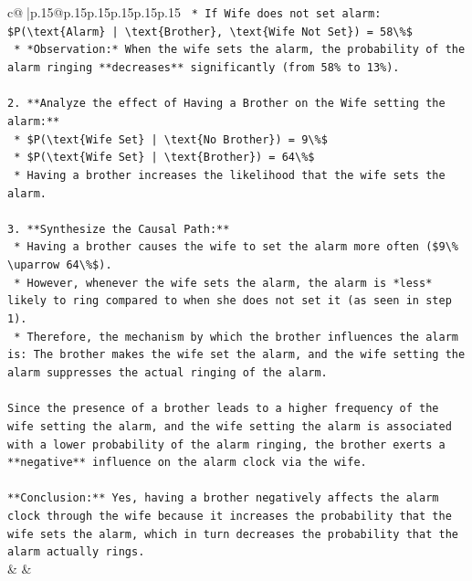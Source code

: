 \documentclass{article}
\begin{document}
{\begin{supertabular}{c@{$\;$}|p{.15\linewidth}@{}p{.15\linewidth}p{.15\linewidth}p{.15\linewidth}p{.15\linewidth}p{.15\linewidth}}
{{{\texttt{        *   If Wife does not set alarm: \$P(\textbackslash{}text\{Alarm\} | \textbackslash{}text\{Brother\}, \textbackslash{}text\{Wife Not Set\}) = 58\textbackslash{}\%\$} \\
\texttt{        *   *Observation:* When the wife sets the alarm, the probability of the alarm ringing **decreases** significantly (from 58\% to 13\%).} \\
\\ 
\texttt{2.  **Analyze the effect of Having a Brother on the Wife setting the alarm:**} \\
\texttt{    *   \$P(\textbackslash{}text\{Wife Set\} | \textbackslash{}text\{No Brother\}) = 9\textbackslash{}\%\$} \\
\texttt{    *   \$P(\textbackslash{}text\{Wife Set\} | \textbackslash{}text\{Brother\}) = 64\textbackslash{}\%\$} \\
\texttt{    *   Having a brother increases the likelihood that the wife sets the alarm.} \\
\\ 
\texttt{3.  **Synthesize the Causal Path:**} \\
\texttt{    *   Having a brother causes the wife to set the alarm more often (\$9\textbackslash{}\% \textbackslash{}uparrow 64\textbackslash{}\%\$).} \\
\texttt{    *   However, whenever the wife sets the alarm, the alarm is *less* likely to ring compared to when she does not set it (as seen in step 1).} \\
\texttt{    *   Therefore, the mechanism by which the brother influences the alarm is: The brother makes the wife set the alarm, and the wife setting the alarm suppresses the actual ringing of the alarm.} \\
\\ 
\texttt{Since the presence of a brother leads to a higher frequency of the wife setting the alarm, and the wife setting the alarm is associated with a lower probability of the alarm ringing, the brother exerts a **negative** influence on the alarm clock via the wife.} \\
\\ 
\texttt{**Conclusion:** Yes, having a brother negatively affects the alarm clock through the wife because it increases the probability that the wife sets the alarm, which in turn decreases the probability that the alarm actually rings.} \\
            }
        }
    }
    & & \\ \\


\end{supertabular}}
\end{document}
